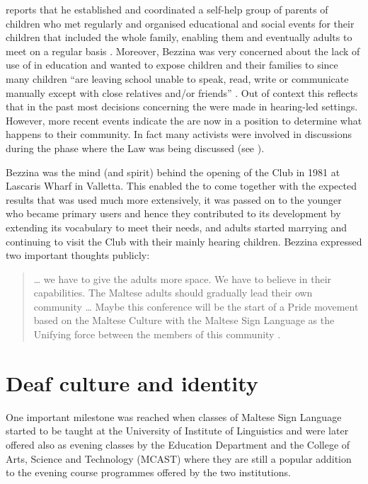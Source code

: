 \documentclass[output=paper]{langsci/langscibook}
\begin{document}
\citet{bezz91} reports that he established and coordinated a
self-help group of parents of  children who met regularly and
organised educational and social events for their children that
included the whole family, enabling them and eventually  adults to
meet on a regular basis \citep[45]{bezz91}.  Moreover, Bezzina
was very concerned about the lack of use of  in
education and wanted to expose  children and their families to
 since many  children “are leaving school unable to
speak, read, write or communicate manually except with close relatives
and/or friends” \citep[46]{bezz91}. Out of context this reflects
that in the past most decisions concerning the  were made in
hearing-led settings.  However, more recent events indicate the 
are now in a position to determine what happens to their community.
In fact many  activists were involved in discussions during the
phase where the  Law was being discussed (see
).

\newpage 
Bezzina was the mind (and spirit) behind the opening of the  Club
in 1981 at Lascaris Wharf in Valletta. This enabled the  to come
together with the expected results that  was used
much more extensively, it was passed on to the younger  who became
primary users and hence they contributed to its development by
extending its vocabulary to meet their needs, and  adults started
marrying and continuing to visit the  Club with their mainly
hearing children.  Bezzina expressed two important thoughts publicly:

\begin{quote}
{\dots} we have to give the  adults more space.  We have to believe
in their capabilities.  The Maltese  adults should gradually lead
their own community {\dots} Maybe this conference will be the start of a
 Pride movement based on the Maltese  Culture with the Maltese
Sign Language as the Unifying force between the members of this
community \citep[48-49]{bezz91}.
\end{quote}

\section{Deaf culture and identity}

One important milestone was reached when classes of Maltese Sign
Language started to be taught at the University of  Institute of
Linguistics and were later offered also as evening classes by the
Education Department and the  College of Arts, Science and
Technology (MCAST) where they are still a popular addition to the
evening course programmes offered by the two institutions.
\end{document}
